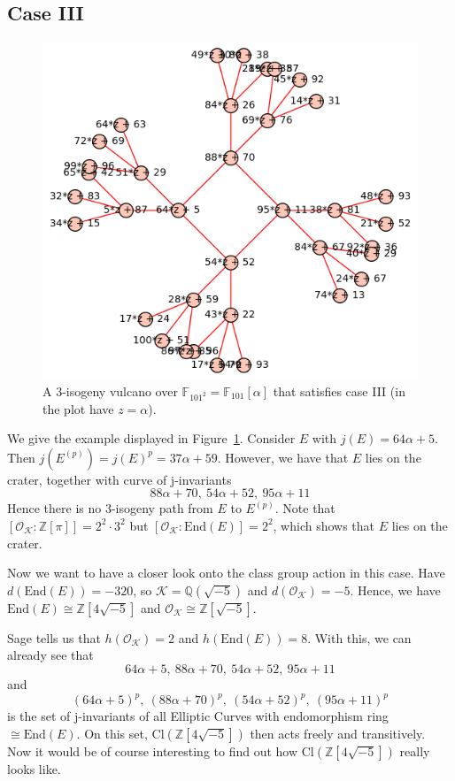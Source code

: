 \documentclass{scrartcl}
\newcommand{\Z}{\mathbb{Z}}
\newcommand{\F}{\mathbb{F}}
\newcommand{\End}{\mathrm{End}}
\newcommand{\Cl}{\mathrm{Cl}}
\newcommand{\K}{\mathcal{K}}
\renewcommand{\O}{\mathcal{O}}
\theoremstyle{definition}
\begin{document}
\subsection{Case III}
\begin{figure}
    \includegraphics{./example_III.png}
    \caption{\label{fig:example_III} A 3-isogeny vulcano over $\F_{101^2} = \F_{101}[\alpha]$ that satisfies case III (in the plot have $z = \alpha$).}
\end{figure}
We give the example displayed in Figure~\ref{fig:example_III}.
Consider $E$ with $j(E) = 64\alpha + 5$.
Then $j(E^{(p)}) = j(E)^p = 37\alpha + 59$.
However, we have that $E$ lies on the crater, together with curve of j-invariants
\begin{equation*}
    88\alpha + 70, \ 54\alpha + 52, \ 95\alpha + 11
\end{equation*}
Hence there is no 3-isogeny path from $E$ to $E^{(p)}$.
Note that $[\O_\K : \Z[\pi]] = 2^2 \cdot 3^2$ but $[\O_\K : \End(E)] = 2^2$, which shows that $E$ lies on the crater.

Now we want to have a closer look onto the class group action in this case.
Have $d(\End(E)) = -320$, so $\K = \mathbb{Q}(\sqrt{-5})$ and $d(\O_\K) = -5$.
Hence, we have $\End(E) \cong \Z[4\sqrt{-5}]$ and $\O_\K \cong \Z[\sqrt{-5}]$.

Sage tells us that $h(\O_\K) = 2$ and $h(\End(E)) = 8$.
With this, we can already see that
\begin{equation*}
    64\alpha + 5, \ 88\alpha + 70, \ 54\alpha + 52, \ 95\alpha + 11
\end{equation*}
and
\begin{equation*}
    (64\alpha + 5)^p, \ (88\alpha + 70)^p, \ (54\alpha + 52)^p, \ (95\alpha + 11)^p
\end{equation*}
is the set of j-invariants of all Elliptic Curves with endomorphism ring $\cong \End(E)$.
On this set, $\Cl(\Z[4\sqrt{-5}])$ then acts freely and transitively.
Now it would be of course interesting to find out how $\Cl(\Z[4\sqrt{-5}])$ really looks like.
\end{document}
